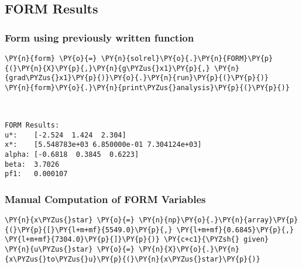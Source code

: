     \hypertarget{form-results}{%
\subsection{FORM Results}\label{form-results}}

    \hypertarget{form-using-previously-written-function}{%
\subsubsection{Form using previously written
function}\label{form-using-previously-written-function}}

    \begin{tcolorbox}[breakable, size=fbox, boxrule=1pt, pad at break*=1mm,colback=cellbackground, colframe=cellborder]
\begin{Verbatim}[commandchars=\\\{\}]
\PY{n}{form} \PY{o}{=} \PY{n}{solrel}\PY{o}{.}\PY{n}{FORM}\PY{p}{(}\PY{n}{X}\PY{p}{,}\PY{n}{g\PYZus{}x1}\PY{p}{,} \PY{n}{grad\PYZus{}x1}\PY{p}{)}\PY{o}{.}\PY{n}{run}\PY{p}{(}\PY{p}{)}
\PY{n}{form}\PY{o}{.}\PY{n}{print\PYZus{}analysis}\PY{p}{(}\PY{p}{)}
\end{Verbatim}
\end{tcolorbox}

    \begin{Verbatim}[commandchars=\\\{\}]


FORM Results:
u*:    [-2.524  1.424  2.304]
x*:    [5.548783e+03 6.850000e-01 7.304124e+03]
alpha: [-0.6818  0.3845  0.6223]
beta:  3.7026
pf1:   0.000107
    \end{Verbatim}

    \hypertarget{manual-computation-of-form-variables}{%
\subsubsection{Manual Computation of FORM
Variables}\label{manual-computation-of-form-variables}}

    \begin{tcolorbox}[breakable, size=fbox, boxrule=1pt, pad at break*=1mm,colback=cellbackground, colframe=cellborder]
\begin{Verbatim}[commandchars=\\\{\}]
\PY{n}{x\PYZus{}star} \PY{o}{=} \PY{n}{np}\PY{o}{.}\PY{n}{array}\PY{p}{(}\PY{p}{[}\PY{l+m+mf}{5549.0}\PY{p}{,} \PY{l+m+mf}{0.6845}\PY{p}{,} \PY{l+m+mf}{7304.0}\PY{p}{]}\PY{p}{)} \PY{c+c1}{\PYZsh{} given}
\PY{n}{u\PYZus{}star} \PY{o}{=} \PY{n}{X}\PY{o}{.}\PY{n}{x\PYZus{}to\PYZus{}u}\PY{p}{(}\PY{n}{x\PYZus{}star}\PY{p}{)}
\end{Verbatim}
\end{tcolorbox}

